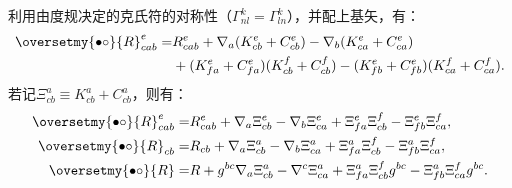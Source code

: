 利用由度规决定的克氏符的对称性（$\Gamma_{nl}^{k}=\Gamma_{ln}^{k}$），并配上基矢，有：
\begin{align*}
	\oversetmy{\bullet\circ}{R}_{cab}^e =& {R}_{cab}^e 
	+ \nabla_a(K_{cb}^{e} + C_{cb}^{e}) - \nabla_b (K_{ca}^{e}  + C_{ca}^{e}) \notag \\
	&+ (K_{fa}^{e} + C_{fa}^{e}) (K_{cb}^{f}+ C_{cb}^{f}) 
	- (K_{fb}^{e} + C_{fb}^{e}) (K_{ca}^{f}+ C_{ca}^{f})  .  %
\end{align*}
若记$\Xi_{cb}^{a} \equiv K_{cb}^{a} + C_{cb}^{a} $，则有：
\begin{subequations}\label{chrg:eqn_RBC-Curvature}
	\begin{align}
		\oversetmy{\bullet\circ}{R}_{cab}^e =& {R}_{cab}^e 
		+ \nabla_a \Xi_{cb}^{e} - \nabla_b \Xi_{ca}^{e} + \Xi_{fa}^{e} \Xi_{cb}^{f}	
		- \Xi_{fb}^{e} \Xi_{ca}^{f} , \label{chrg:eqn_RBC-Curvature-Riemann} \\
		\oversetmy{\bullet\circ}{R}_{cb}=& {R}_{cb} 	+ \nabla_a \Xi_{cb}^{a} - \nabla_b \Xi_{ca}^{a} 
		+ \Xi_{fa}^{a} \Xi_{cb}^{f}	- \Xi_{fb}^{a} \Xi_{ca}^{f} , \label{chrg:eqn_RBC-Curvature-Ricci} \\
		\oversetmy{\bullet\circ}{R}=&	R + g^{bc} \nabla_a \Xi_{cb}^{a} - \nabla^c \Xi_{ca}^{a}  
		+ \Xi_{fa}^{a} \Xi_{cb}^{f} g^{bc} - \Xi_{fb}^{a}  \Xi_{ca}^{f}  g^{bc} . \label{chrg:eqn_RBC-Curvature-scalar}
	\end{align}
\end{subequations}


